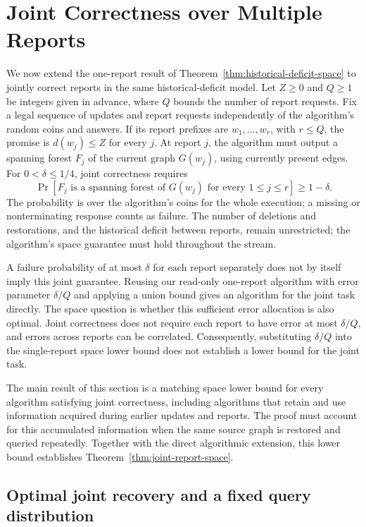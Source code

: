 \documentclass[11pt,letterpaper]{article}
\numberwithin{equation}{section}
\begin{document}
\section{Joint Correctness over Multiple Reports}
\label{sec:restorations-reports}

We now extend the one-report result of Theorem~\ref{thm:historical-deficit-space} to jointly correct reports in the same historical-deficit model.
Let $Z\ge0$ and $Q\ge1$ be integers given in advance, where $Q$ bounds the number of report requests.
Fix a legal sequence of updates and report requests independently of the algorithm's random coins and answers.
If its report prefixes are $w_1,\ldots,w_r$, with $r\le Q$, the promise is $d(w_j)\le Z$ for every $j$.
At report $j$, the algorithm must output a spanning forest $F_j$ of the current graph $G(w_j)$, using currently present edges.
For $0<\delta\le1/4$, joint correctness requires
\[
 \Pr\!\left[\text{$F_j$ is a spanning forest of $G(w_j)$ for every $1\le j\le r$}\right]
 \ge1-\delta.
\]
The probability is over the algorithm's coins for the whole execution; a missing or nonterminating response counts as failure.
The number of deletions and restorations, and the historical deficit between reports, remain unrestricted; the algorithm's space guarantee must hold throughout the stream.

A failure probability of at most $\delta$ for each report separately does not by itself imply this joint guarantee.
Reusing our read-only one-report algorithm with error parameter $\delta/Q$ and applying a union bound gives an algorithm for the joint task directly.
The space question is whether this sufficient error allocation is also optimal.
Joint correctness does not require each report to have error at most $\delta/Q$, and errors across reports can be correlated.
Consequently, substituting $\delta/Q$ into the single-report space lower bound does not establish a lower bound for the joint task.

The main result of this section is a matching space lower bound for every algorithm satisfying joint correctness, including algorithms that retain and use information acquired during earlier updates and reports.
The proof must account for this accumulated information when the same source graph is restored and queried repeatedly.
Together with the direct algorithmic extension, this lower bound establishes Theorem~\ref{thm:joint-report-space}.

\subsection{Optimal joint recovery and a fixed query distribution}
\label{sec:snapshot-finite-joint}
\end{document}
